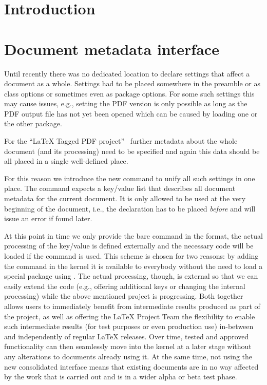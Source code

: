 \documentclass{ltnews}
\providecommand\tubcommand[1]{}
\begin{document}
\tubcommand{\addtolength\textheight{4.2pc}}   %

\maketitle
{ \spaceskip=3.33pt  \tableofcontents}

\setlength{}


\medskip


\section{Introduction}

\section{Document metadata interface}

Until recently there was no dedicated location to declare
settings that affect a document as a whole. Settings had to be placed
somewhere in the preamble or as class options or sometimes even as
package options. For some such settings this may cause issues, e.g.,
setting the PDF version is only possible as long as the PDF output
file has not yet been opened which can be caused by loading one or the
other package.

For the \enquote{\LaTeX{} Tagged PDF project}~\cite{35:blueprint}
further metadata about the whole document (and its processing) need to
be specified and again this data should be all placed in a single
well-defined place.

For this reason we introduce the new command  to
unify all such settings in one place.  The command expects a key/value
list that describes all document metadata for the current document. It
is only allowed to be used at the very beginning of the document,
i.e., the declaration has to be placed \emph{before}
 and will issue an error if found later.


At this point in time we only provide the bare command in the format,
the actual processing of the key/value is defined externally and the
necessary code will be loaded if the command is used. This scheme is
chosen for two reasons: by adding the command in the kernel it is
available to everybody without the need to load a special package
using . The actual processing, though, is external
so that we can easily extend the code (e.g., offering additional keys
or changing the internal processing) while the above mentioned project
is progressing. Both together allows users to immediately benefit from
intermediate results produced as part of the project, as well as
offering the \LaTeX{} Project Team the flexibility to enable such
intermediate results (for test purposes or even production use)
in-between and independently of regular \LaTeX{} releases. Over time,
tested and approved functionality can then seamlessly move into the
kernel at a later stage without any alterations to documents already
using it. At the same time, not using the new consolidated interface
means that existing documents are in no way affected by the work that
is carried out and is in a wider alpha or beta test phase.
\end{document}
